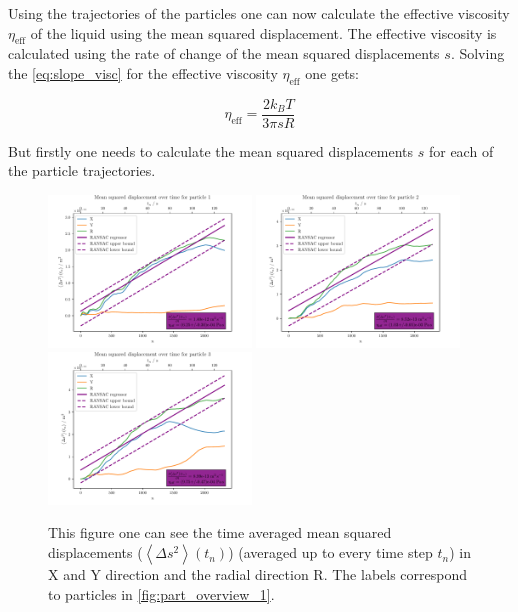 \documentclass[12pt,english,ngerman]{scrartcl}
\begin{document}
Using the trajectories of the particles one can now calculate the effective
viscosity $\eta_\text{eff}$ of the liquid using the mean squared displacement.
The effective viscosity is calculated using the rate of change of the mean
squared displacements $s$. Solving the \autoref{eq:slope_visc} for the
effective viscosity $\eta_\text{eff}$ one gets:

\begin{equation}
	\eta_\text{eff} = \frac{2k_B T}{3\pi s R}
	\label{eq:eff_visc}
\end{equation}

But firstly one needs to calculate the mean squared displacements $s$ for each
of the particle trajectories.


\begin{figure}[H]
	\centering
	\includegraphics[width=0.48\textwidth]{figures/I1_particle_1.pdf}
	\includegraphics[width=0.48\textwidth]{figures/I1_particle_2.pdf}
	\includegraphics[width=0.48\textwidth]{figures/I1_particle_3.pdf}
	\caption[Time averaged mean squared displacements from the particles of the first
		capture]{This figure one can see the time averaged mean squared displacements
		($\left\langle \Delta s^2 \right\rangle(t_n)$) (averaged up to every time step
		$t_n$) in X and Y direction and the radial direction R. The labels correspond
		to particles in \autoref{fig:part_overview_1}.
	}\label{fig:part_first}
\end{figure}
\end{document}
